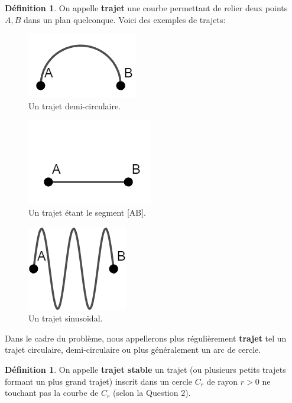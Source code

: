 \documentclass[a4paper]{amsart}
\theoremstyle{definition}
\newtheorem{definition}[theorem]{Définition}
\theoremstyle{remark}
\numberwithin{equation}{section}
\begin{document}
\begin{definition}
  On appelle \textbf{trajet} une courbe permettant de relier deux points $A,B$ dans un plan quelconque. Voici des exemples de trajets:

  \begin{figure}[H]
    \centering
    \includegraphics[scale=0.5]{images/circle.png}
    \caption{Un trajet demi-circulaire.}
  \end{figure}

  \begin{figure}[H]
    \centering
    \includegraphics[scale=0.5]{images/line.png}
    \caption{Un trajet étant le segment [AB].}
  \end{figure}

  \begin{figure}[H]
    \centering
    \includegraphics[scale=0.5]{images/sinus.png}
    \caption{Un trajet sinusoïdal.}
  \end{figure}

  Dans le cadre du problème, nous appellerons plus régulièrement \textbf{trajet} tel un trajet circulaire, demi-circulaire ou plus généralement un arc de cercle.
\end{definition}

\begin{definition}
  On appelle \textbf{trajet stable} un trajet (ou plusieurs petits trajets formant un plus grand trajet) inscrit dans un cercle $C_r$ de rayon $r>0$ ne touchant pas la courbe de $C_r$ (selon la Question 2).
\end{definition}
\end{document}
